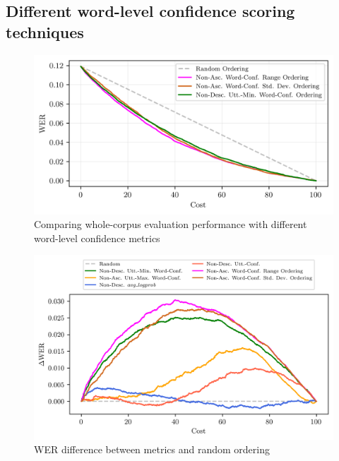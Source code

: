 \clearpage
\subsection{Different word-level confidence scoring techniques}\label{subsec:more-techniques}

\begin{figure}[h!]
 \caption{Comparing whole-corpus evaluation performance with different word-level confidence metrics}
 \label{fig:range-ordering-vs-stddev-vs-min-wconf}
 \includegraphics[width=\textwidth]{figures/range-ordering-vs-stddev-vs-min-wconf.png}
 \centering
\end{figure}
\begin{figure}[h!]
 \caption{WER difference between metrics and random ordering}
 \label{fig:delta-wer}
 \includegraphics[width=\textwidth]{figures/delta-wer-all-allmeasures.png}
 \centering
\end{figure}


